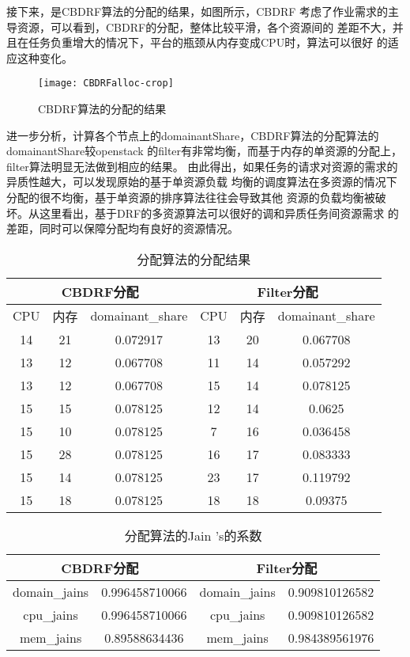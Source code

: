 接下来，是CBDRF算法的分配的结果，如图所示，CBDRF
考虑了作业需求的主导资源，可以看到，CBDRF的分配，整体比较平滑，各个资源间的
差距不大，并且在任务负重增大的情况下，平台的瓶颈从内存变成CPU时，算法可以很好
的适应这种变化。
\begin{figure}[htbp]
\centering\texttt{[image: CBDRFalloc-crop]}
\caption{CBDRF算法的分配的结果}\label{fig:CBDRFalloc}
\end{figure}


进一步分析，计算各个节点上的domainantShare，CBDRF算法的分配算法的domainantShare较openstack
的filter有非常均衡，而基于内存的单资源的分配上，filter算法明显无法做到相应的结果。
由此得出，如果任务的请求对资源的需求的异质性越大，可以发现原始的基于单资源负载
均衡的调度算法在多资源的情况下分配的很不均衡，基于单资源的排序算法往往会导致其他
资源的负载均衡被破坏。从这里看出，基于DRF的多资源算法可以很好的调和异质任务间资源需求
的差距，同时可以保障分配均有良好的资源情况。
\begin{table}[htp]
\begin{center} 
\caption{分配算法的分配结果}
\begin{tabular}{|c|c|c|c|c|c|}
\hline
\multicolumn{3}{|c|}{CBDRF分配} & \multicolumn{3}{|c|}{Filter分配} \\
\hline
CPU & 内存 & domainant\_share &CPU & 内存 & domainant\_share\\
\hline
14&21&0.072917&13&20&0.067708\\
\hline
13&12&0.067708&11&14&0.057292\\
\hline
13&12&0.067708&15&14&0.078125\\
\hline
15&15&0.078125&12&14&0.0625\\
\hline
15&10&0.078125&7&16&0.036458\\
\hline
15&28&0.078125&16&17&0.083333\\
\hline
15&14&0.078125&23&17&0.119792\\
\hline
15&18&0.078125&18&18&0.09375\\
\hline
\end{tabular}
\end{center}
\end{table}

\begin{table}[htp]
\begin{center} 
\caption{分配算法的Jain 's的系数}
\begin{tabular}{|c|c|c|c|}
\hline
\multicolumn{2}{|c|}{CBDRF分配} & \multicolumn{2}{|c|}{Filter分配} \\
\hline
domain\_jains& 0.996458710066&domain\_jains&0.909810126582\\
\hline 
cpu\_jains& 0.996458710066&cpu\_jains&0.909810126582\\
\hline
mem\_jains& 0.89588634436&mem\_jains&0.984389561976\\
\hline
\end{tabular}
\end{center}
\end{table}


